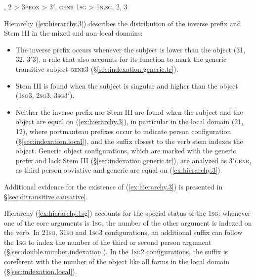 \begin{exe}
\ex \label{ex:empathy.hierarchy.japhug}
\begin{xlist}
\ex \label{ex:hierarchy.3}
, 2 > 3\textsc{prox} > 3$'$, \textsc{genr}
\ex \label{ex:hierarchy.1sg}
\glt \textsc{1sg} > 1\textsc{n}.\textsc{sg}, 2, 3
\end{xlist}
\end{exe}

Hierarchy (\ref{ex:hierarchy.3}) describes the distribution of the inverse  prefix and Stem III in the mixed and non-local domains: 

\begin{itemize}
\item The inverse prefix occurs whenever the subject is lower than the object (3\fl{}1, 3\fl{}2, 3$'$\fl{}3), a rule that also accounts for its function to mark the generic transitive subject \textsc{genr}\fl{}3 (§\ref{sec:indexation.generic.tr}). 
\item Stem III is found when the subject is singular and higher than the object (\textsc{1sg}\fl{}3, \textsc{2sg}\fl{}3, \textsc{3sg}\fl{}3$'$). 
\item Neither the inverse prefix nor Stem III are found when the subject and the object are equal on (\ref{ex:hierarchy.3}), in particular in the local domain (2\fl{}1, 1\fl{}2), where portmanteau prefixes occur to indicate person configuration (§\ref{sec:indexation.local}), and the suffix closest to the verb stem indexes the object. Generic object configurations, which are marked with the  generic prefix and lack Stem III (§\ref{sec:indexation.generic.tr}), 
are analyzed as 3$'$\fl{}\textsc{genr}, as third person obviative and generic are equal on (\ref{ex:hierarchy.3}).
\end{itemize}

Additional evidence for the existence of (\ref{ex:hierarchy.3}) is presented in §\ref{sec:ditransitive.causative}.

Hierarchy (\ref{ex:hierarchy.1sg}) accounts for the special status of the \textsc{1sg}: whenever one of the core arguments is \textsc{1sg}, the number of the other argument is indexed on the verb. In 2\fl{}\textsc{1sg}, 3\fl{}\textsc{1sg} and \textsc{1sg}\fl{}3 configurations, an additional suffix can follow the  \textsc{1sg} to index the number of the third or second person argument (§\ref{sec:double.number.indexation}). In the \textsc{1sg}\fl{}2 configurations, the suffix is coreferent with the number of the object like all forms in the local domain (§\ref{sec:indexation.local}). 

